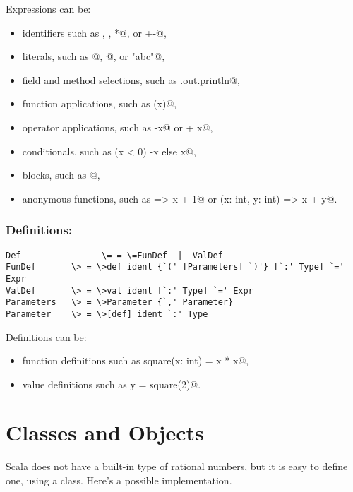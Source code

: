 \documentclass[11pt]{book}
\begin{document}
Expressions can be:
\begin{itemize}
\item
identifiers such as \verb@x@, \verb@isGoodEnough@, \verb@*@, or \verb@+-@,
\item
literals, such as @, @, or \verb@"abc"@,
\item
field and method selections, such as \verb@System.out.println@,
\item
function applications, such as \verb@sqrt(x)@, 
\item
operator applications, such as \verb@-x@ or \verb@y + x@,
\item
conditionals, such as \verb@if (x < 0) -x else x@,
\item
blocks, such as @,
\item
anonymous functions, such as \verb@x => x + 1@ or \verb@(x: int, y: int) => x + y@.
\end{itemize}

\subsection*{Definitions:}

\begin{verbatim}
Def                \= = \=FunDef  |  ValDef
FunDef       \> = \>def ident {`(' [Parameters] `)'} [`:' Type] `=' Expr
ValDef       \> = \>val ident [`:' Type] `=' Expr
Parameters   \> = \>Parameter {`,' Parameter}
Parameter    \> = \>[def] ident `:' Type
\end{verbatim}
Definitions can be:
\begin{itemize}
\item
function definitions such as \verb@def square(x: int) = x * x@, 
\item
value definitions such as \verb@val y = square(2)@.
\end{itemize}

\chapter{Classes and Objects}
\label{chap:classes}

Scala does not have a built-in type of rational numbers, but it is
easy to define one, using a class. Here's a possible implementation.
\end{document}
